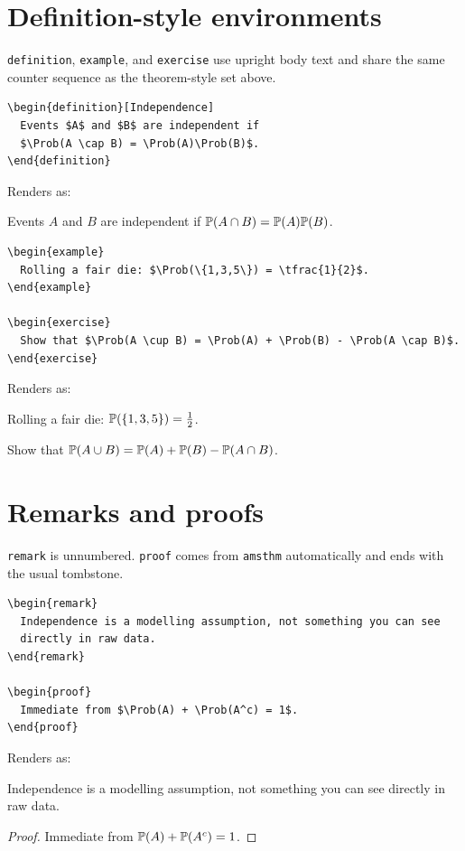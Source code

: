 \documentclass[11pt,letterpaper]{article}
\begin{document}
\section{Definition-style environments}
\texttt{definition}, \texttt{example}, and \texttt{exercise} use upright body
text and share the same counter sequence as the theorem-style set above.

\begin{verbatim}
\begin{definition}[Independence]
  Events $A$ and $B$ are independent if
  $\Prob(A \cap B) = \Prob(A)\Prob(B)$.
\end{definition}
\end{verbatim}
Renders as:
\begin{definition}[Independence]
  Events $A$ and $B$ are independent if
  $\mathbb{P}(A \cap B) = \mathbb{P}(A)\mathbb{P}(B)$.
\end{definition}

\begin{verbatim}
\begin{example}
  Rolling a fair die: $\Prob(\{1,3,5\}) = \tfrac{1}{2}$.
\end{example}

\begin{exercise}
  Show that $\Prob(A \cup B) = \Prob(A) + \Prob(B) - \Prob(A \cap B)$.
\end{exercise}
\end{verbatim}
Renders as:
\begin{example}
  Rolling a fair die: $\mathbb{P}(\{1,3,5\}) = \tfrac{1}{2}$.
\end{example}
\begin{exercise}
  Show that $\mathbb{P}(A \cup B) = \mathbb{P}(A) + \mathbb{P}(B) - \mathbb{P}(A \cap B)$.
\end{exercise}

\section{Remarks and proofs}
\texttt{remark} is unnumbered. \texttt{proof} comes from \texttt{amsthm}
automatically and ends with the usual tombstone.

\begin{verbatim}
\begin{remark}
  Independence is a modelling assumption, not something you can see
  directly in raw data.
\end{remark}

\begin{proof}
  Immediate from $\Prob(A) + \Prob(A^c) = 1$.
\end{proof}
\end{verbatim}
Renders as:
\begin{remark}
  Independence is a modelling assumption, not something you can see
  directly in raw data.
\end{remark}
\begin{proof}
  Immediate from $\mathbb{P}(A) + \mathbb{P}(A^c) = 1$.
\end{proof}
\end{document}
